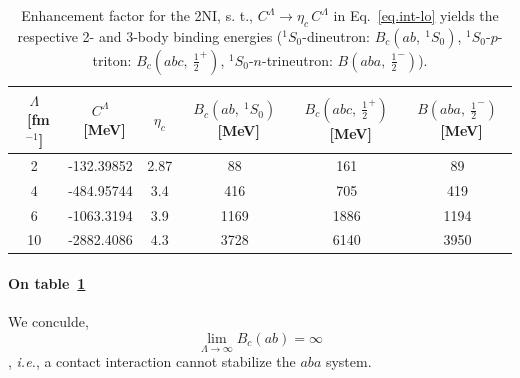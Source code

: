 \documentclass[onecolumn,preprint,nosuperscriptaddress,nofootinbib,12pt,linenumbers]{revtex4-1}
\newcommand{\ie}{\textit{i.e.}\;}
\newcommand{\la}{\label}
\begin{document}
\begin{table}[h!]\la{tab.critlec}
\setlength{\tabcolsep}{10pt}
\renewcommand{\arraystretch}{1.1}
\begin{center}
\begin{tabular}{ c c c c c c}
 $\Lambda$~[fm$^{-1}$]   &   $C^\Lambda$~[MeV]     &    $\eta_c$  & $B_c(ab,~{}^1S_0)$~[MeV] & $B_c(abc,~\frac{1}{2}^+)$~[MeV] & $B(aba,~\frac{1}{2}^-)$~[MeV]\\ \hline
2            &   -132.39852  & 2.87 & 88   & 161  & 89   \\
4            &   -484.95744  & 3.4  & 416  & 705  & 419  \\
6            &   -1063.3194  & 3.9  & 1169 & 1886 & 1194 \\
10           &   -2882.4086  & 4.3  & 3728 & 6140 & 3950 \\
\end{tabular}
\end{center}
\caption{\small Enhancement factor for the 2NI, s. t., $C^\Lambda\to\eta_c\,C^\Lambda$ in
Eq.~\eqref{eq.int-lo} yields the respective 2- and 3-body binding energies (${}^1S_0$-dineutron:
$B_c(ab,~{}^1S_0)$, ${}^1S_0$-$p$-triton: $B_c(abc,~\frac{1}{2}^+)$, ${}^1S_0$-$n$-trineutron:
$B(aba,~\frac{1}{2}^-)$). 
}
\end{table}

\paragraph*{On table~\ref{tab.critlec}} We conculde, 
\begin{equation}\label{eq.b2limit}
    \lim\limits_{\Lambda\to\infty}B_c(ab)=\infty
\end{equation}
, \ie, a contact interaction cannot stabilize the $aba$ system.

\newpage


\end{document}
